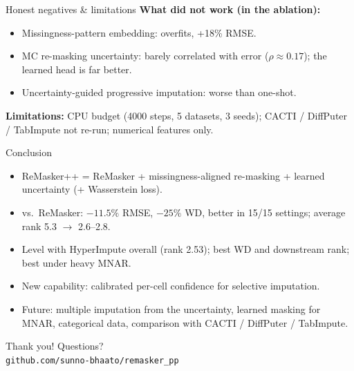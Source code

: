 \documentclass[aspectratio=169,11pt]{beamer}
\newcommand{\rmpp}{ReMasker++}
\begin{document}
\begin{frame}{Honest negatives \& limitations}
\textbf{What did not work (in the ablation):}
\begin{itemize}
\item Missingness-pattern embedding: overfits, +18\% RMSE.
\item MC re-masking uncertainty: barely correlated with error ($\rho\approx0.17$); the learned head is far better.
\item Uncertainty-guided progressive imputation: worse than one-shot.
\end{itemize}
\textbf{Limitations:} CPU budget (4000 steps, 5 datasets, 3 seeds); CACTI / DiffPuter / TabImpute not re-run; numerical features only.
\end{frame}

\begin{frame}{Conclusion}
\begin{itemize}
\item \rmpp{} = ReMasker + \alert{missingness-aligned re-masking} + \alert{learned uncertainty} (+ Wasserstein loss).
\item vs.\ ReMasker: \alert{$-11.5\%$ RMSE, $-25\%$ WD}, better in 15/15 settings; average rank 5.3 $\to$ 2.6--2.8.
\item Level with HyperImpute overall (rank 2.53); \alert{best WD and downstream rank}; \alert{best under heavy MNAR}.
\item \alert{New capability}: calibrated per-cell confidence for selective imputation.
\item Future: multiple imputation from the uncertainty, learned masking for MNAR, categorical data, comparison with CACTI / DiffPuter / TabImpute.
\end{itemize}
\end{frame}

\begin{frame}[standout]
Thank you! Questions?\\[6pt]
\normalsize\texttt{github.com/sunno-bhaato/remasker\_pp}
\end{frame}
\end{document}
